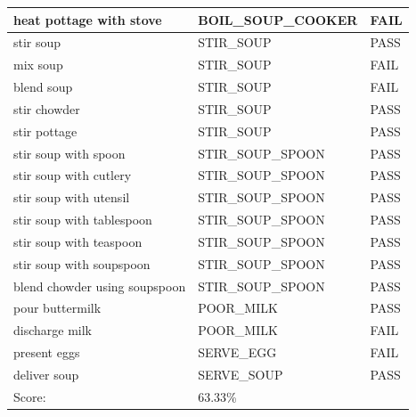 \documentclass[11pt]{article}
\begin{document}
\begin{table}[H]
\begin{tabular}{lll}
\multicolumn{1}{l|}{heat pottage with stove}        & \multicolumn{1}{l|}{BOIL\_SOUP\_COOKER} & \cellcolor[HTML]{FD6864}FAIL \\ \hline
\multicolumn{1}{l|}{stir soup}                      & \multicolumn{1}{l|}{STIR\_SOUP}         & \cellcolor[HTML]{67FD9A}PASS \\ \hline
\multicolumn{1}{l|}{mix soup}                       & \multicolumn{1}{l|}{STIR\_SOUP}         & \cellcolor[HTML]{FD6864}FAIL \\ \hline
\multicolumn{1}{l|}{blend soup}                     & \multicolumn{1}{l|}{STIR\_SOUP}         & \cellcolor[HTML]{FD6864}FAIL \\ \hline
\multicolumn{1}{l|}{stir chowder}                   & \multicolumn{1}{l|}{STIR\_SOUP}         & \cellcolor[HTML]{67FD9A}PASS \\ \hline
\multicolumn{1}{l|}{stir pottage}                   & \multicolumn{1}{l|}{STIR\_SOUP}         & \cellcolor[HTML]{67FD9A}PASS \\ \hline
\multicolumn{1}{l|}{stir soup with spoon}           & \multicolumn{1}{l|}{STIR\_SOUP\_SPOON}  & \cellcolor[HTML]{67FD9A}PASS \\ \hline
\multicolumn{1}{l|}{stir soup with cutlery}         & \multicolumn{1}{l|}{STIR\_SOUP\_SPOON}  & \cellcolor[HTML]{67FD9A}PASS \\ \hline
\multicolumn{1}{l|}{stir soup with utensil}         & \multicolumn{1}{l|}{STIR\_SOUP\_SPOON}  & \cellcolor[HTML]{67FD9A}PASS \\ \hline
\multicolumn{1}{l|}{stir soup with tablespoon}      & \multicolumn{1}{l|}{STIR\_SOUP\_SPOON}  & \cellcolor[HTML]{67FD9A}PASS \\ \hline
\multicolumn{1}{l|}{stir soup with teaspoon}        & \multicolumn{1}{l|}{STIR\_SOUP\_SPOON}  & \cellcolor[HTML]{67FD9A}PASS \\ \hline
\multicolumn{1}{l|}{stir soup with soupspoon}       & \multicolumn{1}{l|}{STIR\_SOUP\_SPOON}  & \cellcolor[HTML]{67FD9A}PASS \\ \hline
\multicolumn{1}{l|}{blend chowder using soupspoon}  & \multicolumn{1}{l|}{STIR\_SOUP\_SPOON}  & \cellcolor[HTML]{67FD9A}PASS \\ \hline
\multicolumn{1}{l|}{pour buttermilk}                   & \multicolumn{1}{l|}{POOR\_MILK}         & \cellcolor[HTML]{67FD9A}PASS \\ \hline
\multicolumn{1}{l|}{discharge milk}                   & \multicolumn{1}{l|}{POOR\_MILK}         & \cellcolor[HTML]{FD6864}FAIL \\ \hline
\multicolumn{1}{l|}{present eggs}                   & \multicolumn{1}{l|}{SERVE\_EGG}         & \cellcolor[HTML]{FD6864}FAIL \\ \hline
\multicolumn{1}{l|}{deliver soup}                   & \multicolumn{1}{l|}{SERVE\_SOUP}         & \cellcolor[HTML]{67FD9A}PASS \\ \hline
\multicolumn{1}{l|}{Score:}                         & \multicolumn{1}{l|}{63.33\%}            &                              \\

\end{tabular}
\end{table}
\end{document}
